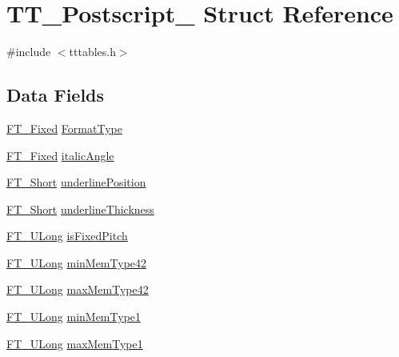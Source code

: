 \hypertarget{struct_t_t___postscript__}{}\section{T\+T\+\_\+\+Postscript\+\_\+ Struct Reference}
\label{struct_t_t___postscript__}


{\ttfamily \#include $<$tttables.\+h$>$}

\subsection*{Data Fields}
\begin{DoxyCompactItemize}
\item 
\hyperlink{fttypes_8h_a5f5a679cc09f758efdd0d1c5feed3c3d}{F\+T\+\_\+\+Fixed} \hyperlink{struct_t_t___postscript___a5ed6585c01fa4ffc3f8537d58bdd955f}{Format\+Type}
\item 
\hyperlink{fttypes_8h_a5f5a679cc09f758efdd0d1c5feed3c3d}{F\+T\+\_\+\+Fixed} \hyperlink{struct_t_t___postscript___adcca36c7fbcbdff00fc8c2884a215830}{italic\+Angle}
\item 
\hyperlink{fttypes_8h_aa7279be89046a2563cd3d4d6651fbdcf}{F\+T\+\_\+\+Short} \hyperlink{struct_t_t___postscript___a909fd5064ab7547bb8ed984b5dfe2fe2}{underline\+Position}
\item 
\hyperlink{fttypes_8h_aa7279be89046a2563cd3d4d6651fbdcf}{F\+T\+\_\+\+Short} \hyperlink{struct_t_t___postscript___a4e4654766a4f27054c9a35958515e186}{underline\+Thickness}
\item 
\hyperlink{fttypes_8h_a4fac88bdba78eb76b505efa6e4fbf3f5}{F\+T\+\_\+\+U\+Long} \hyperlink{struct_t_t___postscript___ab9a537994be4f81cb35f61f83cd97949}{is\+Fixed\+Pitch}
\item 
\hyperlink{fttypes_8h_a4fac88bdba78eb76b505efa6e4fbf3f5}{F\+T\+\_\+\+U\+Long} \hyperlink{struct_t_t___postscript___ad78af4931654c197d4a8d0f04d473885}{min\+Mem\+Type42}
\item 
\hyperlink{fttypes_8h_a4fac88bdba78eb76b505efa6e4fbf3f5}{F\+T\+\_\+\+U\+Long} \hyperlink{struct_t_t___postscript___a70c4ba372d04e686208f0fede9885314}{max\+Mem\+Type42}
\item 
\hyperlink{fttypes_8h_a4fac88bdba78eb76b505efa6e4fbf3f5}{F\+T\+\_\+\+U\+Long} \hyperlink{struct_t_t___postscript___a91a8b40f60e67a1920209e6b08355848}{min\+Mem\+Type1}
\item 
\hyperlink{fttypes_8h_a4fac88bdba78eb76b505efa6e4fbf3f5}{F\+T\+\_\+\+U\+Long} \hyperlink{struct_t_t___postscript___a944a3df5127262db0f7ae92868defb99}{max\+Mem\+Type1}
\end{DoxyCompactItemize}


